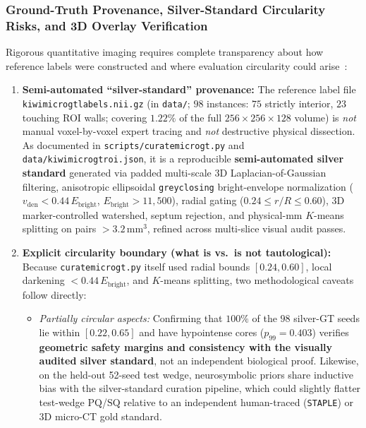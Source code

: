 \documentclass[10pt,a4paper]{article}
\renewcommand{\_}{\origunderscore\allowbreak}
\begin{document}
\subsubsection{Ground-Truth Provenance, Silver-Standard Circularity Risks, and 3D Overlay Verification}
\label{sec:gt_provenance}

Rigorous quantitative imaging requires complete transparency about how reference labels were constructed and where evaluation circularity could arise~\cite{collins2024tripodai,warfield2004staple}:
\begin{enumerate}
    \item \textbf{Semi-automated ``silver-standard'' provenance:} The reference label file \texttt{kiwi\_micro\_gt\_labels.nii.gz} (in \texttt{data/}; $98$ instances: $75$ strictly interior, $23$ touching ROI walls; covering $1.22\%$ of the full $256\times 256\times 128$ volume) is \emph{not} manual voxel-by-voxel expert tracing and \emph{not} destructive physical dissection. As documented in \texttt{scripts/curate\_micro\_gt.py} and \texttt{data/kiwi\_micro\_gt\_roi.json}, it is a reproducible \textbf{semi-automated silver standard} generated via padded multi-scale 3D Laplacian-of-Gaussian filtering, anisotropic ellipsoidal \texttt{grey\_closing} bright-envelope normalization ($v_{\text{den}} < 0.44\,E_{\text{bright}}$, $E_{\text{bright}} > 11{,}500$), radial gating ($0.24 \le r/R \le 0.60$), 3D marker-controlled watershed, septum rejection, and physical-mm $K$-means splitting on pairs $>3.2\,\text{mm}^3$, refined across multi-slice visual audit passes.
    \item \textbf{Explicit circularity boundary (what is vs.\ is not tautological):} Because \texttt{curate\_micro\_gt.py} itself used radial bounds $[0.24, 0.60]$, local darkening $<0.44\,E_{\text{bright}}$, and $K$-means splitting, two methodological caveats follow directly:
    \begin{itemize}
        \item \emph{Partially circular aspects:} Confirming that $100\%$ of the $98$ silver-GT seeds lie within $[0.22, 0.65]$ and have hypointense cores ($p_{99}=0.403$) verifies \textbf{geometric safety margins and consistency with the visually audited silver standard}, not an independent biological proof. Likewise, on the held-out 52-seed test wedge, neurosymbolic priors share inductive bias with the silver-standard curation pipeline, which could slightly flatter test-wedge $\text{PQ}$/$\text{SQ}$ relative to an independent human-traced (\texttt{STAPLE}) or 3D micro-CT gold standard.

\end{itemize}
\end{enumerate}
\end{document}

